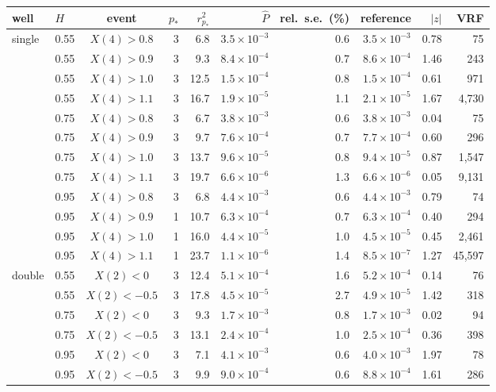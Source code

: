 \begin{tabular}{llcrrrrrrr}\toprule
well & $H$ & event & $p_*$ & $r_{p_*}^2$ & $\widehat P$ & rel.\ s.e.\ (\%) & reference & $|z|$ & VRF\\\midrule
single & 0.55 & $X(4)>0.8$ & 3 & 6.8 & $3.5\times10^{-3}$ & 0.6 & $3.5\times10^{-3}$ & 0.78 & 75\\
 & 0.55 & $X(4)>0.9$ & 3 & 9.3 & $8.4\times10^{-4}$ & 0.7 & $8.6\times10^{-4}$ & 1.46 & 243\\
 & 0.55 & $X(4)>1.0$ & 3 & 12.5 & $1.5\times10^{-4}$ & 0.8 & $1.5\times10^{-4}$ & 0.61 & 971\\
 & 0.55 & $X(4)>1.1$ & 3 & 16.7 & $1.9\times10^{-5}$ & 1.1 & $2.1\times10^{-5}$ & 1.67 & 4{,}730\\
 & 0.75 & $X(4)>0.8$ & 3 & 6.7 & $3.8\times10^{-3}$ & 0.6 & $3.8\times10^{-3}$ & 0.04 & 75\\
 & 0.75 & $X(4)>0.9$ & 3 & 9.7 & $7.6\times10^{-4}$ & 0.7 & $7.7\times10^{-4}$ & 0.60 & 296\\
 & 0.75 & $X(4)>1.0$ & 3 & 13.7 & $9.6\times10^{-5}$ & 0.8 & $9.4\times10^{-5}$ & 0.87 & 1{,}547\\
 & 0.75 & $X(4)>1.1$ & 3 & 19.7 & $6.6\times10^{-6}$ & 1.3 & $6.6\times10^{-6}$ & 0.05 & 9{,}131\\
 & 0.95 & $X(4)>0.8$ & 3 & 6.8 & $4.4\times10^{-3}$ & 0.6 & $4.4\times10^{-3}$ & 0.79 & 74\\
 & 0.95 & $X(4)>0.9$ & 1 & 10.7 & $6.3\times10^{-4}$ & 0.7 & $6.3\times10^{-4}$ & 0.40 & 294\\
 & 0.95 & $X(4)>1.0$ & 1 & 16.0 & $4.4\times10^{-5}$ & 1.0 & $4.5\times10^{-5}$ & 0.45 & 2{,}461\\
 & 0.95 & $X(4)>1.1$ & 1 & 23.7 & $1.1\times10^{-6}$ & 1.4 & $8.5\times10^{-7}$ & 1.27 & 45{,}597\\
\midrule
double & 0.55 & $X(2)<0$ & 3 & 12.4 & $5.1\times10^{-4}$ & 1.6 & $5.2\times10^{-4}$ & 0.14 & 76\\
 & 0.55 & $X(2)<-0.5$ & 3 & 17.8 & $4.5\times10^{-5}$ & 2.7 & $4.9\times10^{-5}$ & 1.42 & 318\\
 & 0.75 & $X(2)<0$ & 3 & 9.3 & $1.7\times10^{-3}$ & 0.8 & $1.7\times10^{-3}$ & 0.02 & 94\\
 & 0.75 & $X(2)<-0.5$ & 3 & 13.1 & $2.4\times10^{-4}$ & 1.0 & $2.5\times10^{-4}$ & 0.36 & 398\\
 & 0.95 & $X(2)<0$ & 3 & 7.1 & $4.1\times10^{-3}$ & 0.6 & $4.0\times10^{-3}$ & 1.97 & 78\\
 & 0.95 & $X(2)<-0.5$ & 3 & 9.9 & $9.0\times10^{-4}$ & 0.6 & $8.8\times10^{-4}$ & 1.61 & 286\\
\bottomrule\end{tabular}
